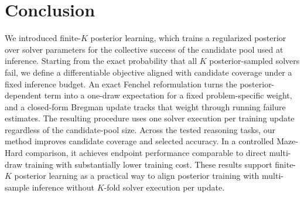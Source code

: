 \section{Conclusion}
\label{sec:conclusion}

We introduced finite-$K$ posterior learning, which trains a regularized posterior over solver parameters for the collective success of the candidate pool used at inference.
Starting from the exact probability that all $K$ posterior-sampled solvers fail, we define a differentiable objective aligned with candidate coverage under a fixed inference budget.
An exact Fenchel reformulation turns the posterior-dependent term into a one-draw expectation for a fixed problem-specific weight, and a closed-form Bregman update tracks that weight through running failure estimates.
The resulting procedure uses one solver execution per training update regardless of the candidate-pool size.
Across the tested reasoning tasks, our method improves candidate coverage and selected accuracy.
In a controlled Maze-Hard comparison, it achieves endpoint performance comparable to direct multi-draw training with substantially lower training cost.
These results support finite-$K$ posterior learning as a practical way to align posterior training with multi-sample inference without $K$-fold solver execution per update.
